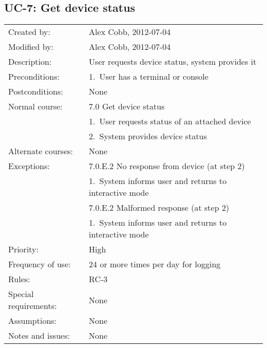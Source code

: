 \documentclass[pdftex,oneside,12pt,a4paper]{book}
\begin{document}
\subsection{UC-7: Get device status}
\begin{tabular}{|l|p{10cm}|}\hline
Created by: & Alex Cobb, 2012-07-04 \\
Modified by: & Alex Cobb, 2012-07-04 \\\hline
Description: & User requests device status, system provides it \\\hline
Preconditions: & 1.\ User has a terminal or console \\\hline
Postconditions: & None \\\hline
Normal course: & 7.0 Get device status\\
 & 1.\ User requests status of an attached device \\
 & 2.\ System provides device status\\\hline
Alternate courses: & None\\\hline
Exceptions: & 7.0.E.2 No response from device (at step 2) \\
 & 1.\ System informs user and returns to interactive mode\\\cline{2-2}
 & 7.0.E.2 Malformed response (at step 2)\\
 & 1.\ System informs user and returns to interactive mode\\\hline
Priority: & High \\\hline
Frequency of use: & 24 or more times per day for logging \\\hline
Rules: & RC-3\\\hline
Special requirements: & None\\\hline
Assumptions: & None\\\hline
Notes and issues: & None\\\hline
\end{tabular}
\end{document}
